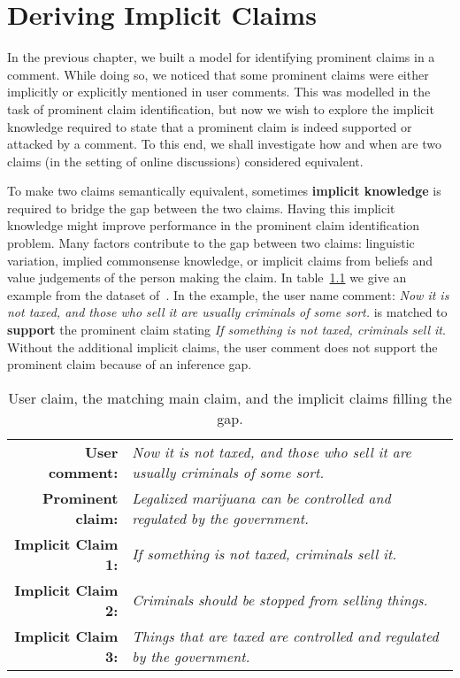 \chapter{Deriving Implicit Claims}
\label{chap:deriving_implicit}

In the previous chapter, we built a model for identifying 
prominent claims in a comment. While doing so, we noticed that 
some prominent claims were either implicitly or explicitly mentioned
in user comments. This was modelled in the task of prominent claim
identification, but now we wish to explore the implicit knowledge required
to state that a prominent claim is indeed supported or attacked by a comment.
To this end, we shall investigate how and when are two claims
(in the setting of online discussions) considered equivalent. 

To make two claims semantically equivalent, sometimes \textbf{implicit knowledge} is
required to bridge the gap between the two claims. 
Having this implicit knowledge might improve performance in the 
prominent claim identification problem. 
Many factors contribute to the gap between two claims: linguistic variation,
implied commonsense knowledge, or implicit claims from beliefs and value
judgements of the person making the claim. In table~\ref{tab:premise_example} we
give an example from the dataset of~\citep{hasan2014you}. 
In the example, the user name comment: 
\emph{Now it is not taxed, and those who sell it are usually criminals of some sort.}
is matched to \textbf{support} the prominent claim stating
\emph{If something is not taxed, criminals sell it}.
Without the additional implicit claims, the user comment does not support the prominent 
claim because of an inference gap. 

\begin{table}
{\normalsize
\begin{tabular}{|@{\ }r@{\ \  }p{}|}
\hline
\textbf{User comment:} & \emph{Now it is not taxed, and those who sell it are usually criminals of some sort.}\\
\textbf{Prominent claim:} & \emph{Legalized marijuana can be controlled and regulated by the government.}\\
\textbf{Implicit Claim 1:} & \emph{If something is not taxed, criminals sell it.}\\
\textbf{Implicit Claim 2:} & \emph{Criminals should be stopped from selling things.}\\
\textbf{Implicit Claim 3:} & \emph{Things that are taxed are controlled and regulated by the government.}\\
\hline
\end{tabular}}
\caption{User claim, the matching main claim, and the implicit claims filling the gap.}
\label{tab:premise_example}
\end{table}

